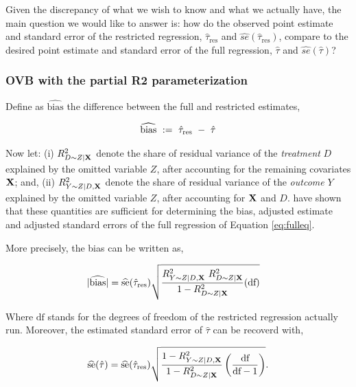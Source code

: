 \documentclass[
]{jss}
\begin{document}
Given the discrepancy of what we wish to know and what we actually have,
the main question we would like to answer is: how do the observed point
estimate and standard error of the restricted regression,
\(\hat{\tau}_{\text{res}}\) and
\(\widehat{se}(\hat{\tau}_{\text{res}})\), compare to the desired point
estimate and standard error of the full regression, \(\hat{\tau}\) and
\(\widehat{se}(\hat{\tau})\)?

\hypertarget{ovb-with-the-partial-r2-parameterization}{%
\subsubsection{OVB with the partial R2
parameterization}\label{ovb-with-the-partial-r2-parameterization}}

Define as \(\widehat{\text{bias}}\) the difference between the full and
restricted estimates,

\begin{align}
\widehat{\text{bias}}~:=~\hat{\tau}_{\text{\text{res}}}~-~\hat{\tau}
\end{align}

Now let: (i) \(R^2_{D\sim Z | {\bf X}}\) denote the share of residual
variance of the \emph{treatment} \(D\) explained by the omitted variable
\(Z\), after accounting for the remaining covariates \({\bf X}\); and,
(ii) \(R^2_{Y\sim Z|D, {\bf X}}\) denote the share of residual variance
of the \emph{outcome} \(Y\) explained by the omitted variable \(Z\),
after accounting for \({\bf X}\) and \(D\). \citet{cinelli:jrssb2019}
have shown that these quantities are sufficient for determining the
bias, adjusted estimate and adjusted standard errors of the full
regression of Equation \ref{eq:fulleq}.

More precisely, the bias can be written as,

\begin{align}
|\widehat{\text{bias}}| &= \widehat{\text{se}}(\hat{\tau}_{\text{res}}) \sqrt{\frac{ R^2_{Y\sim Z|D, {\bf X}}~ R^2_{D\sim Z | {\bf X}}}{1 - R^2_{D\sim Z | {\bf X}}} (\text{df})} \label{eq:r2bias2}
\end{align}

Where \(\text{df}\) stands for the degrees of freedom of the restricted
regression actually run. Moreover, the estimated standard error of
\(\hat{\tau}\) can be recoverd with,

\begin{align}
\widehat{\text{se}}(\hat{\tau})  = \widehat{\text{se}}(\hat{\tau}_{\text{res}}) \sqrt{\frac{1 - R^2_{Y\sim Z|D, {\bf X}}}{1 - R^2_{D\sim Z | {\bf X}}} \left(\frac{\text{df}}{\text{df}-1}\right)}.  \label{eq:r2se} 
\end{align}
\end{document}
